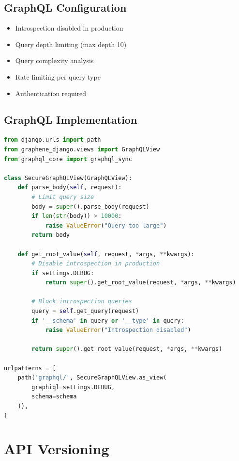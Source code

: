 \documentclass{report}
\begin{document}
\subsection{GraphQL Configuration}
\begin{itemize}
\item Introspection disabled in production
\item Query depth limiting (max depth 10)
\item Query complexity analysis
\item Rate limiting per query type
\item Authentication required
\end{itemize}

\subsection{GraphQL Implementation}
\begin{lstlisting}[language=Python]
from django.urls import path
from graphene_django.views import GraphQLView
from graphql_core import graphql_sync

class SecureGraphQLView(GraphQLView):
    def parse_body(self, request):
        # Limit query size
        body = super().parse_body(request)
        if len(str(body)) > 10000:
            raise ValueError("Query too large")
        return body
    
    def get_root_value(self, request, *args, **kwargs):
        # Disable introspection in production
        if settings.DEBUG:
            return super().get_root_value(request, *args, **kwargs)
        
        # Block introspection queries
        query = self.get_query(request)
        if '__schema' in query or '__type' in query:
            raise ValueError("Introspection disabled")
        
        return super().get_root_value(request, *args, **kwargs)

urlpatterns = [
    path('graphql/', SecureGraphQLView.as_view(
        graphiql=settings.DEBUG,
        schema=schema
    )),
]
\end{lstlisting}

\section{API Versioning}
\end{document}
